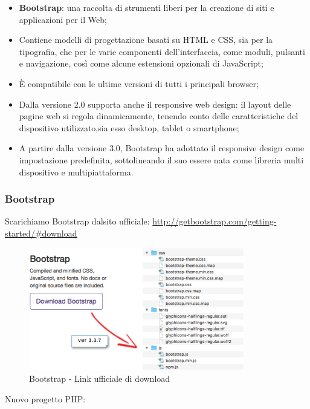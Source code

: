 \begin{itemize}

\item \textbf{Bootstrap}: una raccolta di strumenti liberi per la creazione di siti e applicazioni per il Web;
\item Contiene modelli di progettazione basati su HTML e CSS, sia per la tipografia, che per le varie componenti dell'interfaccia, come moduli, pulsanti e navigazione, così come alcune estensioni opzionali di JavaScript;
\item È compatibile con le ultime versioni di tutti i principali browser;
\item Dalla versione 2.0 supporta anche il responsive web design: il layout delle pagine web si regola dinamicamente, tenendo conto delle caratteristiche del dispositivo utilizzato,sia esso desktop, tablet o smartphone;
\item A partire dalla versione 3.0, Bootstrap ha adottato il responsive design come impostazione predefinita, sottolineando il suo essere nata come libreria multi dispositivo e multipiattaforma.

\end{itemize}


\subsubsection{Bootstrap}

Scarichiamo Bootstrap dalsito ufficiale: \newline\url{http://getbootstrap.com/getting-started/#download}

\begin{center}
\begin{figure}[H]
\centering
\includegraphics[scale=1]{figures/bootstrap_howto.png}
\caption{Bootstrap - Link ufficiale di download} 
\end{figure}
\end{center}

Nuovo progetto PHP:

